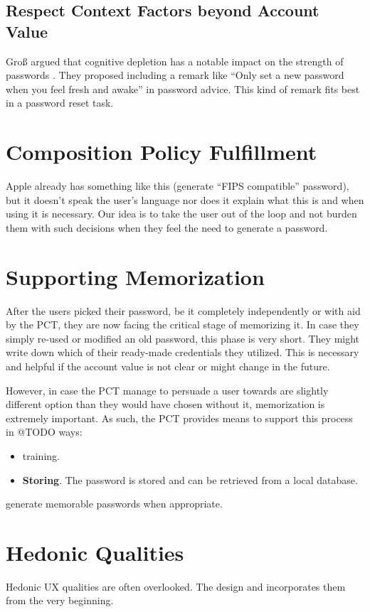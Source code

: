 \subsection{Respect Context Factors beyond Account Value}
Groß \etal argued that cognitive depletion has a notable impact on the strength of passwords \cite{Gross2016EffectCognitiveEffort}. They proposed including a remark like ``Only set a new password when you feel fresh and awake'' in password advice. This kind of remark fits best in a password reset task. 


\section{Composition Policy Fulfillment}
Apple already has something like this (generate ``FIPS compatible'' password), but it doesn't speak the user's language nor does it explain what this is and when using it is necessary. Our idea is to take the user out of the loop and not burden them with such decisions when they feel the need to generate a password. 

\section{Supporting Memorization}
After the users picked their password, be it completely independently or with aid by the PCT, they are now facing the critical stage of memorizing it. In case they simply re-used or modified an old password, this phase is very short. They might write down which of their ready-made credentials they utilized. This is necessary and helpful if the account value is not clear or might change in the future. 

However, in case the PCT manage to persuade a user towards are slightly different option than they would have chosen without it, memorization is extremely important. As such, the PCT provides means to support this process in @TODO ways:
\begin{itemize}
\item training. 
\item \textbf{Storing}. The password is stored and can be retrieved from a local database. 
\end{itemize}

generate memorable passwords when appropriate. 

\section{Hedonic Qualities}
Hedonic UX qualities are often overlooked. The design and incorporates them from the very beginning. 

